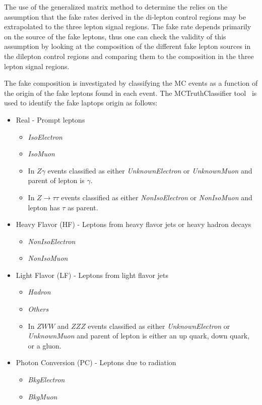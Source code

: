 The use of the generalized matrix method to determine the 
relies on the assumption that the 
fake rates derived in the di-lepton control regions may be extrapolated to the three lepton signal regions.  
The fake rate depends primarily on the source of the fake leptons, thus
one can check the validity of this assumption by looking at the composition of the
different fake lepton sources in the dilepton control regions and comparing 
them to the
composition in the three lepton signal regions. 

The fake composition is investigated by classifying the MC events as a function of the origin of the fake leptons found in each event.  The MCTruthClassifier tool~\cite{MCtruthclassifier:twiki} is used
to identify the fake laptops origin as follows:

\begin{itemize}
\item Real - Prompt leptons
		\begin{itemize}
		\item \emph{IsoElectron} 
		\item \emph{IsoMuon}
		\item In $Z\gamma$ events classified as either \emph{UnknownElectron} or \emph{UnknownMuon} and parent of lepton is $\gamma$.
		\item In $Z\rightarrow\tau\tau$ events classified as either \emph{NonIsoElectron} or \emph{NonIsoMuon} and lepton has $\tau$ as parent.
		\end{itemize}
\item Heavy Flavor (HF) - Leptons from heavy flavor jets or heavy hadron decays
		\begin{itemize}
		\item \emph{NonIsoElectron} 
		\item \emph{NonIsoMuon}
		\end{itemize}
\item Light Flavor (LF) -  Leptons from light flavor jets
		\begin{itemize}
		\item \emph{Hadron} 
		\item \emph{Others}
		\item In $ZWW$ and $ZZZ$ events classified as either \emph{UnknownElectron} or \emph{UnknownMuon} and parent of lepton is either an up quark, down quark, or a gluon.
		\end{itemize}
\item Photon Conversion (PC)  - Leptons due to radiation
		\begin{itemize}
		\item \emph{BkgElectron} 
		\item \emph{BkgMuon}
		\end{itemize}

\end{itemize}

